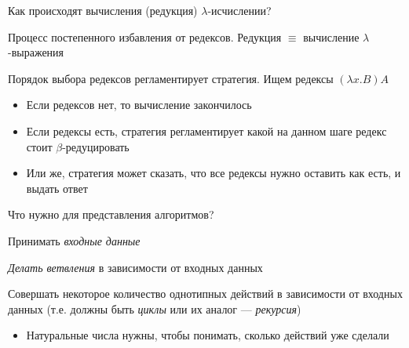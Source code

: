 \begin{frame}{Как происходят вычисления (редукция) $\lambda$-исчислении?}
\begin{definition}[Редукция]
Процесс постепенного избавления от редексов. Редукция $\equiv$ вычисление $\lambda$-выражения
\end{definition}

\begin{definition}[Стратегия]
  Порядок выбора редексов регламентирует стратегия. Ищем редексы $(\lambda x. B)A$
  \begin{itemize}
    \item Если редексов нет, то вычисление закончилось
    \item Если редексы есть, стратегия регламентирует какой на данном шаге редекс стоит $\beta$-редуцировать
    \item Или же, стратегия может сказать, что все редексы нужно оставить как есть, и выдать ответ
  \end{itemize}
\end{definition}
\end{frame}

\begin{frame}{Что нужно для представления алгоритмов?}

     Принимать \emph{входные данные}\vspace{1em}

    \emph{Делать ветвления}  в зависимости от входных данных\vspace{1em}

    Совершать некоторое количество однотипных действий в зависимости от входных данных (т.е. должны быть \emph{циклы} или их аналог --- \emph{рекурсия})
    \begin{itemize}
\item  Натуральные числа нужны, чтобы понимать, сколько действий уже сделали
    \end{itemize}
\end{frame}


